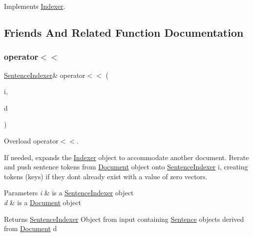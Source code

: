 Implements \hyperlink{class_indexer_a8301fcbdf40afd926ab71d4767575d32}{Indexer}.



\subsection{Friends And Related Function Documentation}
\mbox{\label{class_sentence_indexer_a30be5b0aa936deff7dc8763b554083ef}} 
\subsubsection{\texorpdfstring{operator$<$$<$}{operator<<}\hspace{0.1cm}{\footnotesize\ttfamily [1/3]}}
{\footnotesize\ttfamily \hyperlink{class_sentence_indexer}{Sentence\+Indexer}\& operator$<$$<$ (\begin{DoxyParamCaption}\item[{\hyperlink{class_sentence_indexer}{Sentence\+Indexer} \&}]{i,  }\item[{const \hyperlink{class_document}{Document} \&}]{d }\end{DoxyParamCaption})\hspace{0.3cm}{\ttfamily [friend]}}



Overload operator$<$$<$. 

If needed, expands the \hyperlink{class_indexer}{Indexer} object to accommodate another document. Iterate and push sentence tokens from \hyperlink{class_document}{Document} object onto \hyperlink{class_sentence_indexer}{Sentence\+Indexer} i, creating tokens (keys) if they don\textquotesingle{}t already exist with a value of zero vectors.


\begin{DoxyParams}{Parameters}
{\em i} & is a \hyperlink{class_sentence_indexer}{Sentence\+Indexer} object \\
\hline
{\em d} & is a \hyperlink{class_document}{Document} object \\
\hline
\end{DoxyParams}
\begin{DoxyReturn}{Returns}
\hyperlink{class_sentence_indexer}{Sentence\+Indexer} Object from input containing \hyperlink{class_sentence}{Sentence} objects derived from \hyperlink{class_document}{Document} d 
\end{DoxyReturn}
\mbox{\label{class_sentence_indexer_ae40f2c0786940505a8881ad209f2e892}} 
